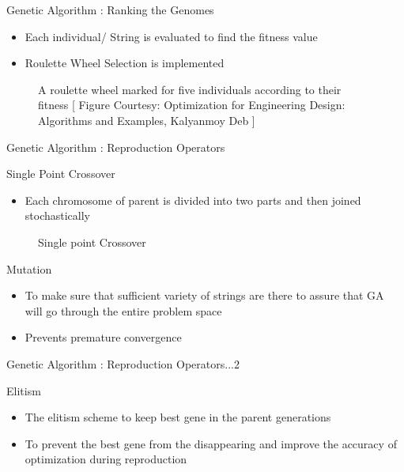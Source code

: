 \documentclass{beamer}
\begin{document}
\begin{frame}{Genetic Algorithm : Ranking the Genomes}

\begin{itemize}
  \item Each individual/ String is evaluated to find the fitness value

\item Roulette Wheel Selection is implemented

\end{itemize}
\begin{figure}

\caption{\label{fig:your-figure12} A roulette wheel marked for five individuals according to their fitness [ Figure Courtesy: Optimization for Engineering Design: Algorithms and Examples, Kalyanmoy Deb ]}
\end{figure}
\end{frame}
\begin{frame}{Genetic Algorithm : Reproduction Operators}
\begin{block}{Single Point Crossover}
\begin{itemize}
  \item Each chromosome of parent is divided into two parts and then joined stochastically
\end{itemize}
\end{block}
\begin{figure}

\caption{\label{fig:your-figure13} Single point Crossover}
\end{figure}
\begin{block}{Mutation}
\begin{itemize}
  \item To make sure that sufficient variety of strings are there to assure that GA will go through the entire problem space
  \item Prevents premature convergence
\end{itemize}
\end{block}
\end{frame}
\begin{frame}{Genetic Algorithm : Reproduction Operators...2}
\begin{block}{Elitism}
\begin{itemize}
  \item The elitism scheme to keep best gene in the parent generations
  \item To prevent the best gene from the disappearing and improve the accuracy of
optimization during reproduction
\end{itemize}
\end{block}
\end{frame}
\end{document}
